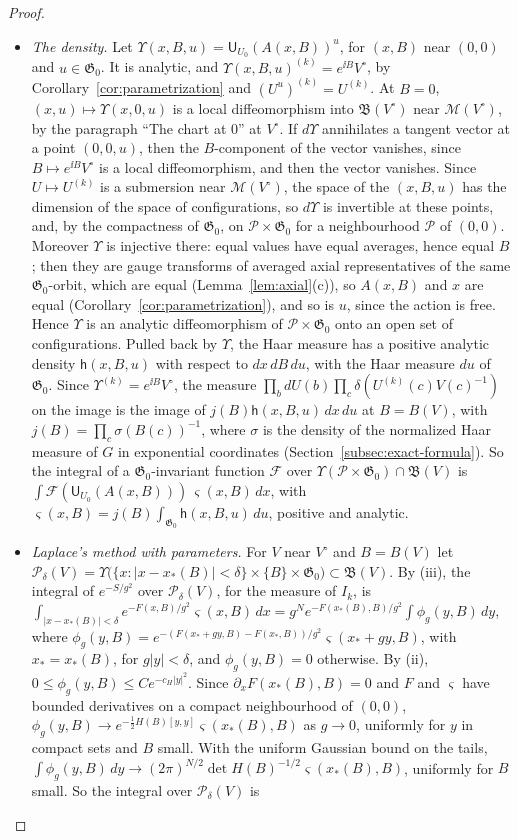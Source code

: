 \begin{proof}
\begin{itemize}
\item[(iii)] \emph{The density.} Let $\Upsilon(x,B,u)=\mathsf U_{U_0}(A(x,B))^u$, for $(x,B)$ near $(0,0)$ and $u\in\mathfrak G_0$. It is analytic, and $\Upsilon(x,B,u)^{(k)}=e^{\ii B}V^\circ$, by Corollary~\ref{cor:parametrization} and $(U^u)^{(k)}=U^{(k)}$. At $B=0$, $(x,u)\mapsto\Upsilon(x,0,u)$ is a local diffeomorphism into $\mathfrak B(V^\circ)$ near $\mathscr M(V^\circ)$, by the paragraph ``The chart at $0$'' at $V^\circ$. If $d\Upsilon$ annihilates a tangent vector at a point $(0,0,u)$, then the $B$-component of the vector vanishes, since $B\mapsto e^{\ii B}V^\circ$ is a local diffeomorphism, and then the vector vanishes. Since $U\mapsto U^{(k)}$ is a submersion near $\mathscr M(V^\circ)$, the space of the $(x,B,u)$ has the dimension of the space of configurations, so $d\Upsilon$ is invertible at these points, and, by the compactness of $\mathfrak G_0$, on $\mathcal P\times\mathfrak G_0$ for a neighbourhood $\mathcal P$ of $(0,0)$. Moreover $\Upsilon$ is injective there: equal values have equal averages, hence equal $B$; then they are gauge transforms of averaged axial representatives of the same $\mathfrak G_0$-orbit, which are equal (Lemma~\ref{lem:axial}(c)), so $A(x,B)$ and $x$ are equal (Corollary~\ref{cor:parametrization}), and so is $u$, since the action is free. Hence $\Upsilon$ is an analytic diffeomorphism of $\mathcal P\times\mathfrak G_0$ onto an open set of configurations. Pulled back by $\Upsilon$, the Haar measure has a positive analytic density $\mathsf h(x,B,u)$ with respect to $dx\,dB\,du$, with the Haar measure $du$ of $\mathfrak G_0$. Since $\Upsilon^{(k)}=e^{\ii B}V^\circ$, the measure $\prod_bdU(b)\prod_c\delta(U^{(k)}(c)V(c)^{-1})$ on the image is the image of $j(B)\mathsf h(x,B,u)\,dx\,du$ at $B=B(V)$, with $j(B)=\prod_c\sigma(B(c))^{-1}$, where $\sigma$ is the density of the normalized Haar measure of $G$ in exponential coordinates (Section~\ref{subsec:exact-formula}). So the integral of a $\mathfrak G_0$-invariant function $\mathcal F$ over $\Upsilon(\mathcal P\times\mathfrak G_0)\cap\mathfrak B(V)$ is $\int\mathcal F(\mathsf U_{U_0}(A(x,B)))\,\varsigma(x,B)\,dx$, with $\varsigma(x,B)=j(B)\int_{\mathfrak G_0}\mathsf h(x,B,u)\,du$, positive and analytic.
\item[(iv)] \emph{Laplace's method with parameters.} For $V$ near $V^\circ$ and $B=B(V)$ let $\mathcal P_\delta(V)=\Upsilon\big(\{x:|x-x_*(B)|<\delta\}\times\{B\}\times\mathfrak G_0\big)\subset\mathfrak B(V)$. By (iii), the integral of $e^{-S/g^2}$ over $\mathcal P_\delta(V)$, for the measure of $I_k$, is $\int_{|x-x_*(B)|<\delta}e^{-F(x,B)/g^2}\varsigma(x,B)\,dx=g^Ne^{-F(x_*(B),B)/g^2}\int\phi_g(y,B)\,dy$, where $\phi_g(y,B)=e^{-(F(x_*+gy,B)-F(x_*,B))/g^2}\varsigma(x_*+gy,B)$, with $x_*=x_*(B)$, for $g|y|<\delta$, and $\phi_g(y,B)=0$ otherwise. By (ii), $0\le\phi_g(y,B)\le Ce^{-c_H|y|^2}$. Since $\partial_xF(x_*(B),B)=0$ and $F$ and $\varsigma$ have bounded derivatives on a compact neighbourhood of $(0,0)$, $\phi_g(y,B)\to e^{-\frac12H(B)[y,y]}\varsigma(x_*(B),B)$ as $g\to0$, uniformly for $y$ in compact sets and $B$ small. With the uniform Gaussian bound on the tails, $\int\phi_g(y,B)\,dy\to(2\pi)^{N/2}\det H(B)^{-1/2}\varsigma(x_*(B),B)$, uniformly for $B$ small. So the integral over $\mathcal P_\delta(V)$ is

\end{itemize}
\end{proof}
